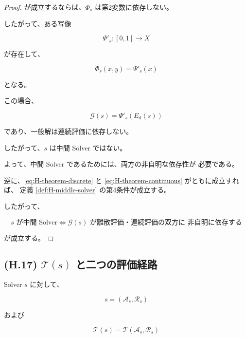 \documentclass[a4paper,11pt]{article}
\begin{document}
\begin{proof}
が成立するならば、$\Phi_s$ は第2変数に依存しない。

したがって、ある写像

\begin{equation}
    \Psi'_s:
    [0,1]
    \longrightarrow
    X
\end{equation}

が存在して、

\begin{equation}
    \Phi_s(x,y)
    =
    \Psi'_s(x)
\end{equation}

となる。

この場合、

\begin{equation}
    \mathcal{G}(s)
    =
    \Psi'_s(E_{\mathrm d}(s))
\end{equation}

であり、一般解は連続評価に依存しない。

したがって、$s$ は中間 Solver ではない。

よって、中間 Solver であるためには、両方の非自明な依存性が
必要である。

逆に、\eqref{eq:H-theorem-discrete} と
\eqref{eq:H-theorem-continuous} がともに成立すれば、
定義 \ref{def:H-middle-solver} の第4条件が成立する。

したがって、

\begin{equation}
    \boxed{
        s\text{ が中間 Solver}
        \iff
        \mathcal{G}(s)
        \text{ が離散評価・連続評価の双方に
        非自明に依存する}
    }
\end{equation}

が成立する。

\end{proof}


\subsection{(H.17) $\mathcal{T}(s)$ と二つの評価経路}
\label{subsec:H17}

Solver $s$ に対して、

\begin{equation}
    s=(\mathcal{A}_s,\mathcal{R}_s)
\end{equation}

および

\begin{equation}
    \mathcal{T}(s)
    =
    \mathcal{T}(\mathcal{A}_s,\mathcal{R}_s)
\end{equation}
\end{document}
